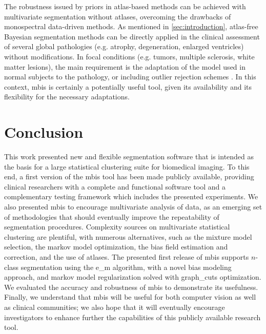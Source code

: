 The robustness issued by priors in atlas-based methods can be achieved
  with multivariate segmentation without atlases, overcoming the drawbacks of
  monospectral data-driven methods.
As mentioned in \autoref{sec:introduction}, atlas-free Bayesian segmentation methods
  can be directly applied in the clinical assessment of several global pathologies (e.g.
  atrophy, degeneration, enlarged ventricles) without modifications.
In focal conditions (e.g. tumors, multiple sclerosis, white matter lesions),
  the main requirement is the adaptation of the model used in normal subjects to the
  pathology, or including outlier rejection schemes \citep{van_leemput_automated_2001}.
In this context, \gls*{mbis} is certainly a potentially useful tool, given its
  availability and its flexibility for the necessary adaptations.


\section{Conclusion}
This work presented new and flexible segmentation software that is
  intended as the basis for a large statistical clustering
  suite for biomedical imaging.
To this end, a first version of the \gls*{mbis} tool has been made publicly 
  available, providing clinical researchers with a complete and functional
 software tool and a complementary testing framework which includes the
 presented experiments.
We also presented \gls*{mbis} to encourage multivariate analysis of data,
  as an emerging set of methodologies that should eventually
  improve the repeatability of segmentation procedures.
Complexity sources on multivariate statistical clustering are plentiful, with
  numerous alternatives, such as the mixture model selection,
  the \gls*{markov} model optimization, the bias field estimation 
  and correction, and the use of atlases.
The presented first release of \gls*{mbis} supports $n$-class segmentation using
  the \gls*{e_m} algorithm, with a novel bias modeling approach, and
  \gls*{markov} model regularization solved with \gls*{graph_cuts}
  optimization.
We evaluated the accuracy and robustness of \gls*{mbis} to demonstrate its usefulness.
Finally, we understand that \gls*{mbis} will be useful for both computer vision as
  well as clinical communities; we also hope that it will eventually encourage
  investigators to enhance further the capabilities of this publicly available 
  research tool.